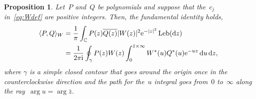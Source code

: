 \documentclass[10pt,a4paper]{article}
\numberwithin{equation}{section}
\newtheorem{Proposition}[Theorem]{Proposition}
\DeclareMathOperator{\Leb}{Leb}
\newcommand*{\Cset}{\mathbb{C}} %
\begin{document}
 \begin{Proposition}
 \label{prop:Contour1}
 Let~$P$ and~$Q$ be polynomials and suppose that the~$c_j$ in~\eqref{eq:Wdef} are positive integers.
 Then, the fundamental identity holds,
 \begin{align}
 \langle P, Q \rangle_W &= \frac{1}{\pi} \int_{\Cset} P(z) \overline{Q(z)} |W(z)|^2 {\rm e}^{-|z|^2} \Leb({\rm d}z)\nonumber \\
 & = \frac{1}{2\pi {\rm i}} \oint_{\gamma} P(z) W(z) \int_{0}^{\bar{z} \times \infty} W^*(u) Q^*(u) {\rm e}^{-uz}\, {\rm d}u\, {\rm d}z, \label{eq:PQscalar}
 \end{align}
 where $\gamma$ is a simple closed contour that goes around the origin once in the counterclockwise direction and the path for the~$u$ integral goes from~$0$ to~$\infty$ along the ray~$\arg u = \arg \bar{z}$.
 \end{Proposition}
\end{document}
